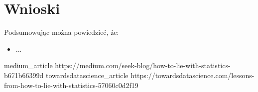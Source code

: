 \documentclass{classrep}
\begin{document}
    \section{}
    \label{good_examples}{

    }

    \section{Wnioski} {
        Podsumowując można powiedzieć, że:
        \begin{itemize}
            \item ...

        \end{itemize}
    }

    \begin{thebibliography}{0}
        \bibitem
        {medium_article}
        {https://medium.com/seek-blog/how-to-lie-with-statistics-b671b66399d}
        \bibitem
        {towardsdatascience_article}
        {https://towardsdatascience.com/lessons-from-how-to-lie-with-statistics-57060c0d2f19}
    \end{thebibliography}
\end{document}
